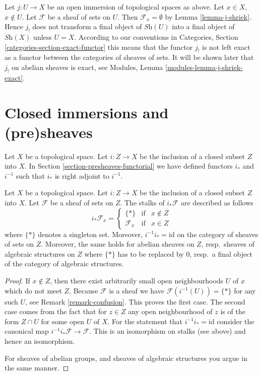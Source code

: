 \begin{remark}
\label{remark-j-shriek-not-exact}
Let $j : U \to X$ be an open immersion of topological spaces as above.
Let $x \in X$, $x \not \in U$. Let $\mathcal{F}$ be a sheaf of sets
on $U$. Then $\mathcal{F}_x = \emptyset$ by Lemma \ref{lemma-j-shriek}.
Hence $j_!$ does not transform a final object of $\textit{Sh}(U)$
into a final object of $\textit{Sh}(X)$ unless $U = X$.
According to our conventions in
Categories, Section \ref{categories-section-exact-functor}
this means that the functor $j_!$ is not left exact
as a functor between the categories of sheaves of sets.
It will be shown later that $j_!$ on abelian sheaves is exact,
see Modules, Lemma \ref{modules-lemma-j-shriek-exact}.
\end{remark}








\section{Closed immersions and (pre)sheaves}
\label{section-closed-immersions}

\noindent
Let $X$ be a topological space.
Let $i : Z \to X$ be the inclusion of a closed subset $Z$ into $X$.
In Section \ref{section-presheaves-functorial} we have defined
functors $i_*$ and $i^{-1}$ such that $i_*$ is right adjoint to
$i^{-1}$.

\begin{lemma}
\label{lemma-stalks-closed-pushforward}
Let $X$ be a topological space.
Let $i : Z \to X$ be the inclusion of a closed subset $Z$ into $X$.
Let $\mathcal{F}$ be a sheaf of sets on $Z$.
The stalks of $i_*\mathcal{F}$ are described as follows
$$
i_*\mathcal{F}_x =
\left\{
\begin{matrix}
\{*\} & \text{if} & x \not \in Z \\
\mathcal{F}_x & \text{if} & x \in Z
\end{matrix}
\right.
$$
where $\{*\}$ denotes a singleton set. Moreover,
$i^{-1}i_* = \text{id}$ on the category of sheaves
of sets on $Z$. Moreover, the same holds for abelian
sheaves on $Z$, resp.\ sheaves of algebraic structures on $Z$
where $\{*\}$ has to be replaced by $0$, resp.\ a
final object of the category of algebraic structures.
\end{lemma}

\begin{proof}
If $x \not \in Z$, then there exist arbitrarily small open
neighbourhoods $U$ of $x$ which do not meet $Z$.
Because $\mathcal{F}$ is a sheaf
we have $\mathcal{F}(i^{-1}(U)) = \{*\}$ for any such $U$,
see Remark \ref{remark-confusion}. This proves the first case.
The second case comes from the fact that for $z \in Z$
any open neighbourhood of $z$ is of the form $Z \cap U$ for
some open $U$ of $X$. For the statement that
$i^{-1}i_* = \text{id}$ consider the canonical map
$i^{-1}i_*\mathcal{F} \to \mathcal{F}$. This is an isomorphism
on stalks (see above) and hence an isomorphism.

\medskip\noindent
For sheaves of abelian groups, and sheaves of algebraic structures
you argue in the same manner.
\end{proof}


